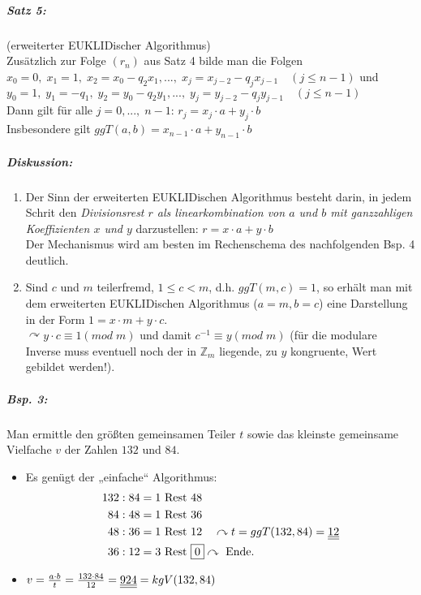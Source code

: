 \subparagraph{Satz 5:}  (erweiterter EUKLIDischer Algorithmus)\\
Zusätzlich zur Folge $(r_n)$ aus Satz 4 bilde man die Folgen \\
$x_0=0,\; x_1=1, \; x_2 = x_0 - q_2x_1, ...,\; x_j=x_{j-2}-q_jx_{j-1}\quad (j\leq n-1)$ und\\
$y_0=1, \; y_1=-q_1, \; y_2=y_0- q_2 y_1, ... ,\; y_j=y_{j-2}-q_jy_{j-1}\quad (j \leq n-1)$\\
Dann gilt für alle $j=0, ..., \; n-1$: $\boxed{r_j=x_j\cdot a + y_j \cdot b}$\\
Insbesondere gilt $\boxed{ggT(a,b) = x_{n-1}\cdot a + y_{n-1}\cdot b}$
\subparagraph{Diskussion:}
\begin{enumerate}
\item Der Sinn der erweiterten EUKLIDischen Algorithmus besteht darin, in jedem Schrit den \emph{Divisionsrest $r$ als linearkombination von $a$ und $b$ mit ganzzahligen Koeffizienten $x$ und $y$} darzustellen: $r=x\cdot a + y\cdot b$\\
Der Mechanismus wird am besten im Rechenschema des nachfolgenden Bsp. 4 deutlich.
\item  Sind $c$ und $m$ teilerfremd, $1\leq c < m$, d.h. $ggT(m,c)=1$, so erhält man mit dem erweiterten EUKLIDischen Algorithmus ($a=m, b=c$) eine Darstellung in der Form $\boxed{1=x\cdot m+ y\cdot c}$.\\
$\curvearrowright y\cdot c \equiv 1 (mod\; m)$ und damit $c^{-1}\equiv y (mod\; m)$ (für die modulare Inverse muss eventuell noch der in $\mathbb{Z}_m$ liegende, zu $y$ kongruente, Wert gebildet werden!).
\end{enumerate}

\subparagraph{Bsp. 3:} \parskp
Man ermittle den größten gemeinsamen Teiler $t$ sowie das kleinste gemeinsame Vielfache $v$ der Zahlen $132$ und $84$.
\begin{itemize}
\item Es genügt der „einfache“ Algorithmus:
\begin{align*}
132:84 &= 1\text{ Rest } 48\\
84:48 &= 1\text{ Rest } 36\\
48:36 &= 1\text{ Rest } 12 \quad \curvearrowright t = ggT (132,84) = \underline{\underline{12}}\\
36:12 &= 3\text{ Rest } \boxed{0} \curvearrowright \text{ Ende.}\\
\end{align*}
\item $v=\frac{a \cdot b}{t}=\frac{132\cdot 84}{12}=\underline{\underline{924}}=kgV (132,84)$
\end{itemize}

